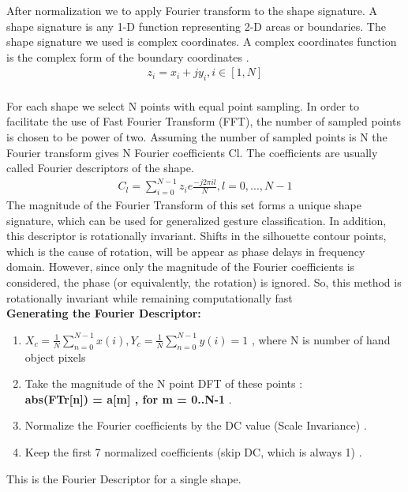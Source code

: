 After normalization we to apply Fourier transform to the
shape signature. A shape signature is any 1-D function
representing 2-D areas or boundaries. The shape signature we
used is complex coordinates. A complex coordinates function
is the complex form of the boundary coordinates \cite{20}. \\
\begin{gather}
    z_{i} = x_{i}+j y_{i} , i\in [1,N]
\end{gather}\\
For each shape we select N points with equal point
sampling. In order to facilitate the use of Fast Fourier
Transform (FFT), the number of sampled points is chosen to
be power of two. Assuming the number of sampled points is
N the Fourier transform gives N Fourier coefficients Cl. The
coefficients are usually called Fourier descriptors of the shape. 
\begin{gather}
C_{l}= \sum_{i=0}^{N-1} z_{i}e{\frac{-j 2\pi il}{N}} , l = 0,...,N-1
\end{gather}
The magnitude of the Fourier
Transform of this set forms a unique shape signature, which can be used for generalized
gesture classification.
In addition, this descriptor is rotationally invariant. Shifts in the silhouette contour
points, which is the cause of rotation, will be appear as phase delays in frequency
domain. However, since only the magnitude of the Fourier coefficients is considered,
the phase (or equivalently, the rotation) is ignored. So, this method is rotationally
invariant while remaining computationally fast\\


\textbf{Generating the Fourier Descriptor: }
\begin{enumerate}
    \item $X_{c} = \frac{1}{N}\sum_{n=0}^{N-1} x(i) , Y_{c} = \frac{1}{N}\sum_{n=0}^{N-1} y(i)  = 1$ , where N is number of hand object pixels 
    \item Take the magnitude of the N point DFT of these points :\\
              \textbf{ abs(FT{r[n]}) = a[m] , for m = 0..N-1 }.
    \item Normalize the Fourier coefficients by the DC value (Scale Invariance) .
    \item Keep the first 7 normalized coefficients (skip DC, which is always 1) .

\end{enumerate}


This is the Fourier Descriptor for a single shape.\\

